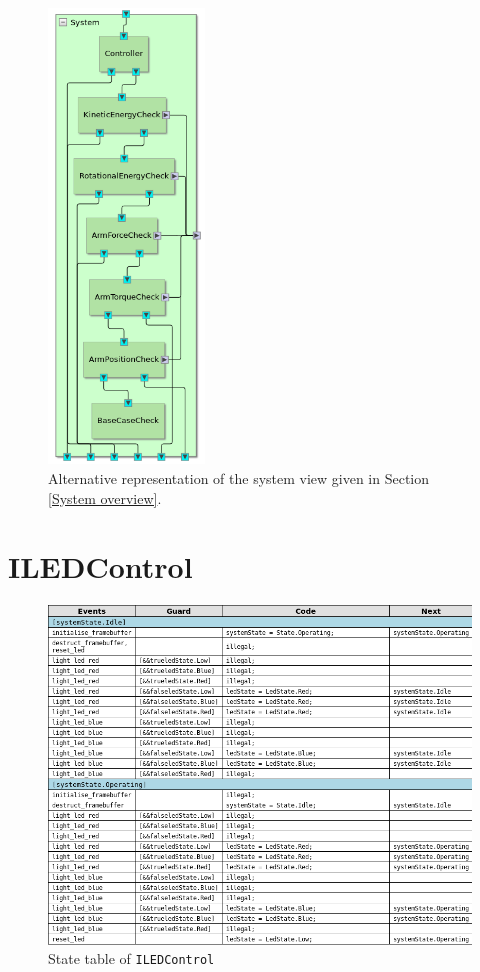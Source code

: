\documentclass[12pt]{scrreprt}
\begin{document}
\begin{appendices}
\begin{figure}[H]
    \centering
    \includegraphics[width=0.37\textwidth]{Figures/results/modelling_figures/system_view/system_view_alt.png}
    \caption{Alternative representation of the system view given in Section \ref{System overview}.}
    \label{fig:system_view_alt}
\end{figure}


\section{ILEDControl}
\begin{figure}[H]
    \centering
    \includegraphics[width=\textwidth]{Figures/results/modelling_figures/ILEDControl/ILEDControl_state_table.png}
    \caption{State table of \texttt{ILEDControl}}
    \label{fig:ILEDControl_state_table}
\end{figure}


\end{appendices}
\end{document}
